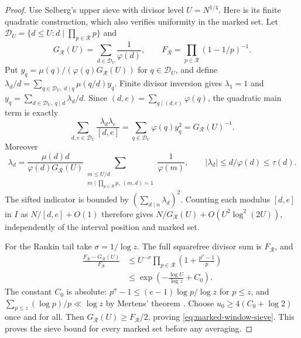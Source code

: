 \documentclass[11pt]{article}
\theoremstyle{definition}
\theoremstyle{remark}
\numberwithin{equation}{section}
\begin{document}
\begin{proof}
Use Selberg's upper sieve with divisor level $U=N^{1/4}$.
Here is its finite quadratic construction, which also verifies uniformity in the marked set.
Let $\mathcal D_U=\{d\le U:d\mid\prod_{p\in\mathcal R}p\}$ and
\begin{equation}\label{eq:selberg-GF}
 G_{\mathcal R}(U)=\sum_{d\in\mathcal D_U}\frac1{\varphi(d)},\qquad
 F_{\mathcal R}=\prod_{p\in\mathcal R}(1-1/p)^{-1}.
\end{equation}
Put $y_q=\mu(q)/(\varphi(q)G_{\mathcal R}(U))$ for $q\in\mathcal D_U$, and define
$\lambda_d/d=\sum_{q\in\mathcal D_U,\ d\mid q}\mu(q/d)y_q$.
Finite divisor inversion gives $\lambda_1=1$ and $y_q=\sum_{d\in\mathcal D_U,\ q\mid d}\lambda_d/d$.
Since $(d,e)=\sum_{q\mid(d,e)}\varphi(q)$, the quadratic main term is exactly
\begin{equation}\label{eq:selberg-diagonalization}
 \sum_{d,e\in\mathcal D_U}\frac{\lambda_d\lambda_e}{[d,e]}
 =\sum_{q\in\mathcal D_U}\varphi(q)y_q^2=G_{\mathcal R}(U)^{-1}.
\end{equation}
Moreover
\begin{equation}\label{eq:selberg-weight-bound}
 \lambda_d=\frac{\mu(d)d}{\varphi(d)G_{\mathcal R}(U)}
 \sum_{\substack{m\le U/d\\m\mid\prod_{p\in\mathcal R}p,\ (m,d)=1}}\frac1{\varphi(m)},\qquad
 |\lambda_d|\le d/\varphi(d)\le\tau(d).
\end{equation}
The sifted indicator is bounded by $(\sum_{d\mid n}\lambda_d)^2$.
Counting each modulus $[d,e]$ in $I$ as $N/[d,e]+O(1)$ therefore gives
$N/G_{\mathcal R}(U)+O(U^2\log^2(2U))$, independently of the interval position and marked set.

For the Rankin tail take $\sigma=1/\log z$. The full squarefree divisor sum is $F_{\mathcal R}$, and
\begin{equation}\label{eq:selberg-rankin-tail}
\begin{aligned}
 \frac{F_{\mathcal R}-G_{\mathcal R}(U)}{F_{\mathcal R}}
 &\le U^{-\sigma}\prod_{p\in\mathcal R}\left(1+\frac{p^\sigma-1}{p}\right)\\
 &\le\exp\left(-\frac{\log U}{\log z}+C_0\right).
\end{aligned}
\end{equation}
The constant $C_0$ is absolute: $p^\sigma-1\le(e-1)\log p/\log z$ for $p\le z$, and
$\sum_{p\le z}(\log p)/p\ll\log z$ by Mertens' theorem \cite[Section~2.2]{MV}.
Choose $u_0\ge4(C_0+\log2)$ once and for all. Then $G_{\mathcal R}(U)\ge F_{\mathcal R}/2$, proving
\eqref{eq:marked-window-sieve}. This proves the sieve bound for every marked set before any averaging.


\end{proof}
\end{document}
